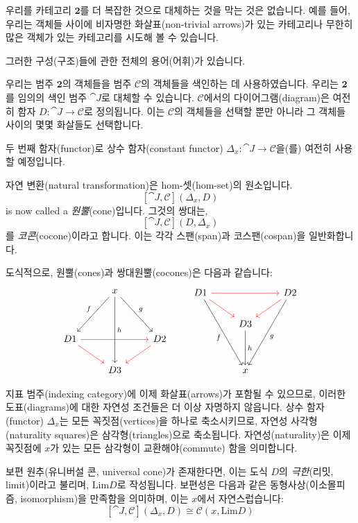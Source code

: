 \documentclass[DaoFP]{subfiles}
\begin{document}
우리를 카테고리 $\mathbf{2}$를 더 복잡한 것으로 대체하는 것을 막는 것은 없습니다. 예를 들어, 우리는 객체들 사이에 비자명한 화살표(non-trivial arrows)가 있는 카테고리나 무한히 많은 객체가 있는 카테고리를 시도해 볼 수 있습니다.

그러한 구성(구조)들에 관한 전체의 용어(어휘)가 있습니다.

우리는 범주 $\mathbf{2}$의 객체들을 범주 $\mathcal{C}$의 객체들을 색인하는 데 사용하였습니다. 우리는 $\mathbf{2}$를 임의의 색인 범주 $\cat J$로 대체할 수 있습니다. $\mathcal{C}$에서의 다이어그램(diagram)은 여전히 함자 $D \colon \cat J \to \mathcal{C}$로 정의됩니다. 이는 $\mathcal{C}$의 객체들을 선택할 뿐만 아니라 그 객체들 사이의 몇몇 화살들도 선택합니다.

두 번째 함자(functor)로 상수 함자(constant functor) $\Delta_x \colon \cat J \to \mathcal{C}$을(를) 여전히 사용할 예정입니다.

자연 변환(natural transformation)은 hom-셋(hom-set)의 원소입니다.
\[ [\cat J, \mathcal{C}](\Delta_x, D)  \]
is now called a \emph{원뿔}(cone)입니다. 그것의 쌍대는,
\[ [\cat J, \mathcal{C}](D, \Delta_x)  \]
를 \emph{코콘}(cocone)이라고 합니다. 이는 각각 스팬(span)과 코스팬(cospan)을 일반화합니다.

도식적으로, 원뿔(cones)과 쌍대원뿔(cocones)은 다음과 같습니다:
\[
 \begin{tikzcd}
  & x
\arrow[ddr, "g"]
 \arrow[ddl, "f"']
 \arrow[ddd, "h"]
 \\
\\
D 1 
\arrow[rr, red]
\arrow[rd, red]
&& D 2
\arrow[dl, red]
\\
& D 3
 \end{tikzcd}
 \qquad
\begin{tikzcd}
 D 1
 \arrow[rr, red]
 \arrow[dr, red]
 \arrow[dddr, "f"']
 && D 2
\arrow[dl, red]
 \arrow[dddl, "g"]
 \\
 & D 3
 \arrow[dd, "h"]
 \\
 \\
 & x
 \end{tikzcd}
 \]

지표 범주(indexing category)에 이제 화살표(arrows)가 포함될 수 있으므로, 이러한 도표(diagrams)에 대한 자연성 조건들은 더 이상 자명하지 않읍니다. 상수 함자(functor) $\Delta_x$는 모든 꼭짓점(vertices)을 하나로 축소시키므로, 자연성 사각형(naturality squares)은 삼각형(triangles)으로 축소됩니다. 자연성(naturality)은 이제 꼭짓점에 $x$가 있는 모든 삼각형이 교환해야(commute) 함을 의미합니다.

보편 원추(유니버설 콘, universal cone)가 존재한다면, 이는 도식 $D$의 \emph{극한}(리밋, limit)이라고 불리며, $\text{Lim}D$로 작성됩니다. 보편성은 다음과 같은 동형사상(이소몰피즘, isomorphism)을 만족함을 의미하며, 이는 $x$에서 자연스럽습니다:
\[ [\cat J, \mathcal{C}](\Delta_x, D)  \cong \mathcal{C}(x, \text{Lim}D) \]
\end{document}
